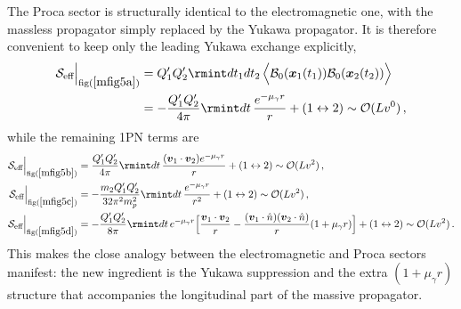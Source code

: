 The Proca sector is structurally identical to the electromagnetic one, with the massless propagator simply replaced by the Yukawa propagator. It is therefore convenient to keep only the leading Yukawa exchange explicitly,
\begin{align}
    \begin{split}
     \mathcal{S}_{\text{eff}}\Big|_{\text{fig}(\ref{mfig5a})}
     &=Q_1'Q_2'\rmint dt_1 dt_2\,\Big\langle\mathcal{B}_{0}(\boldsymbol{x}_1(t_1))\mathcal{B}_{0}(\boldsymbol{x}_2(t_2))\Big\rangle\\ &
     =-\frac{Q_1'Q_2'}{4\pi}\rmint dt\,\frac{e^{-\mu_{\gamma}r}}{r}+(1\leftrightarrow 2)\sim \mathcal{O}(Lv^0)\,,
    \end{split}
\end{align}
while the remaining 1PN terms are
\begin{align}
    \mathcal{S}_{\text{eff}}\Big|_{\text{fig}(\ref{mfig5b})}
    &=\frac{Q_1' Q_2'}{4\pi}\rmint dt\, \frac{(\boldsymbol{v}_1\cdot \boldsymbol{v}_2)e^{-\mu_{\gamma}r}}{ r}+(1\leftrightarrow 2)\sim \mathcal{O}(Lv^2)\,,\\
    \mathcal{S}_{\text{eff}}\Big|_{\text{fig}(\ref{mfig5c})}
    &=-\frac{m_2Q_1'Q_2'}{32\pi^2 m_p^2}\rmint dt \,\frac{e^{-\mu_{\gamma}r}}{r^2}+(1\leftrightarrow 2)\sim \mathcal{O}(Lv^2)\,,\\
    \mathcal{S}_{\text{eff}}\Big|_{\text{fig}(\ref{mfig5d})}
    &=-\frac{Q_1'Q_2'}{8\pi}\rmint dt \,e^{-\mu_{\gamma}r}\Big[\frac{\boldsymbol{v}_1\cdot\boldsymbol{v}_2}{r}-\frac{(\boldsymbol{v}_1\cdot\Hat{n})(\boldsymbol{v}_2\cdot\Hat{n})}{r}(1+\mu_{\gamma}r)\Big]+(1\leftrightarrow 2)\sim\mathcal{O}(Lv^2)\,.
\end{align}
This makes the close analogy between the electromagnetic and Proca sectors manifest: the new ingredient is the Yukawa suppression and the extra $(1+\mu_{\gamma}r)$ structure that accompanies the longitudinal part of the massive propagator.

